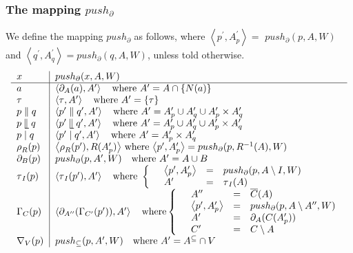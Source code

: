 \documentclass{article}
\begin{document}
\subsubsection{The mapping $push_{\partial }$}

We define the mapping $push_{\partial }$ as follows, where $\left\langle
p^{\prime },A_{p}^{\prime }\right\rangle =$ $push_{\partial }(p,A,W)$ and $%
\left\langle q^{\prime },A_{q}^{\prime }\right\rangle =push_{\partial
}(q,A,W)$, unless told otherwise.%
\[
\begin{tabular}{l|l}
$x$ & $push_{\partial }(x,A,W)$ \\ \hline
$a$ & $\left\langle \partial _{A}(a),A^{\prime }\right\rangle \text{ where }%
A^{\prime }=A\cap \{N(a)\}$ \\ 
$\tau $ & $\left\langle \tau ,A^{\prime }\right\rangle \text{ where }%
A^{\prime }=\{\tau \}$ \\ 
$p\parallel q$ & $\left\langle p^{\prime }\parallel q^{\prime },A^{\prime
}\right\rangle \text{ where }A^{\prime }=A_{p}^{\prime }\cup A_{q}^{\prime
}\cup A_{p}^{\prime }\times A_{q}^{\prime }$ \\ 
$p\mathbin{\mathrel{\llfloor}}q$ & $\left\langle p^{\prime }%
\mathbin{\mathrel{\llfloor}}q^{\prime },A^{\prime }\right\rangle \text{
where }A^{\prime }=A_{p}^{\prime }\cup A_{q}^{\prime }\cup A_{p}^{\prime
}\times A_{q}^{\prime }$ \\ 
$p\mid q$ & $\left\langle p^{\prime }\mid q^{\prime },A^{\prime
}\right\rangle \text{ where }A^{\prime }=A_{p}^{\prime }\times A_{q}^{\prime
}$ \\ 
$\rho _{R}(p)$ & $\left\langle \rho _{R}(p^{\prime }),R(A_{p}^{\prime
})\right\rangle $ where $\left\langle p^{\prime },A_{p}^{\prime
}\right\rangle =push_{\partial }(p,R^{-1}(A),W)$ \\ 
$\partial _{B}(p)$ & $push_{\partial }(p,A^{\prime },W)\text{ where }%
A^{\prime }=A\cup B$ \\ 
$\tau _{I}(p)$ & $\left\langle \tau _{I}(p^{\prime }),A^{\prime
}\right\rangle \text{ where }\left\{ \text{ }%
\begin{array}{lll}
\left\langle p^{\prime },A_{p}^{\prime }\right\rangle & = & push_{\partial
}(p,A\setminus I,W) \\ 
A^{\prime } & = & \tau _{I}(A)%
\end{array}%
\right. $ \\ 
$\Gamma _{C}(p)$ & $\left\langle \partial _{A^{\prime \prime }}(\Gamma
_{C^{\prime }}(p^{\prime })),A^{\prime }\right\rangle \text{ where}\left\{ 
\text{ }%
\begin{array}{lll}
A^{\prime \prime } & = & \overline{C}(A) \\ 
\left\langle p^{\prime },A_{p}^{\prime }\right\rangle & = & push_{\partial
}(p,A\setminus A^{\prime \prime },W) \\ 
A^{\prime } & = & \partial _{A}(C(A_{p}^{\prime })) \\ 
C^{\prime } & = & C\setminus A%
\end{array}%
\right. $ \\ 
$\nabla _{V}(p)$ & $push_{\subseteq }(p,A^{\prime },W)\text{ where }%
A^{\prime }=A^{\subseteq }\cap V$%
\end{tabular}%
\]
\end{document}
